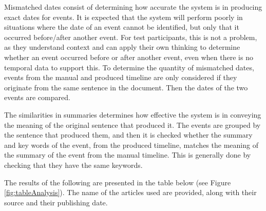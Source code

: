 \par Mismatched dates consist of determining how accurate the system is in producing exact dates for events. It is expected that the system will perform poorly in situations where the date of an event cannot be identified, but only that it occurred before/after another event. For test participants, this is not a problem, as they understand context and can apply their own thinking to determine whether an event occurred before or after another event, even when there is no temporal data to support this. To determine the quantity of mismatched dates, events from the manual and produced timeline are only considered if they originate from the same sentence in the document. Then the dates of the two events are compared.

\par The similarities in summaries determines how effective the system is in conveying the meaning of the original sentence that produced it. The events are grouped by the sentence that produced them, and then it is checked whether the summary and key words of the event, from the produced timeline, matches the meaning of the summary of the event from the manual timeline. This is generally done by checking that they have the same keywords.

\par The results of the following are presented in the table below (see Figure \ref{fig:tableAnalysis}). The name of the articles used are provided, along with their source and their publishing date.

